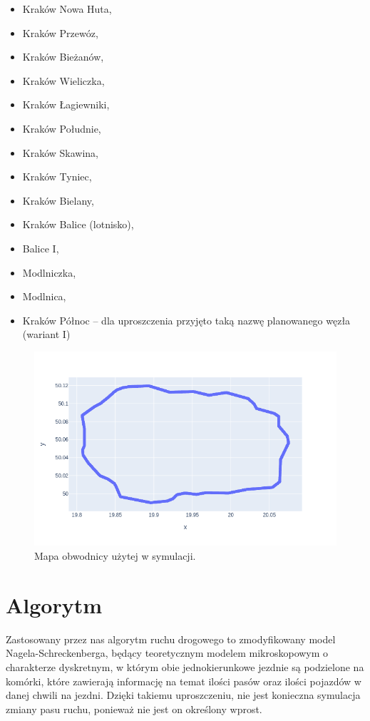 \documentclass[a4paper,12pt]{article}
\begin{document}
	\begin{itemize}
		\item Kraków Nowa Huta,
		\item Kraków Przewóz,
		\item Kraków Bieżanów,
		\item Kraków Wieliczka,
		\item Kraków Łagiewniki,
		\item Kraków Południe,
		\item Kraków Skawina,
		\item Kraków Tyniec,
		\item Kraków Bielany,
		\item Kraków Balice (lotnisko),
		\item Balice I,
		\item Modlniczka,
		\item Modlnica,
		\item Kraków Północ -- dla uproszczenia przyjęto taką nazwę planowanego węzła (wariant I)
	\end{itemize}

	\begin{figure}[h]
		\centering
		\includegraphics[width=\textwidth]{img/note-map.png}
		\caption{Mapa obwodnicy użytej w symulacji.}
	\end{figure}

    \section{Algorytm}
    Zastosowany przez nas algorytm ruchu drogowego to zmodyfikowany model Nagela-Schreckenberga, będący teoretycznym modelem mikroskopowym o charakterze dyskretnym, w którym obie jednokierunkowe jezdnie są podzielone na komórki, które zawierają informację na temat ilości pasów oraz ilości pojazdów w danej chwili na jezdni. Dzięki takiemu uproszczeniu, nie jest konieczna symulacja zmiany pasu ruchu, ponieważ nie jest on określony wprost.
    
\end{document}
